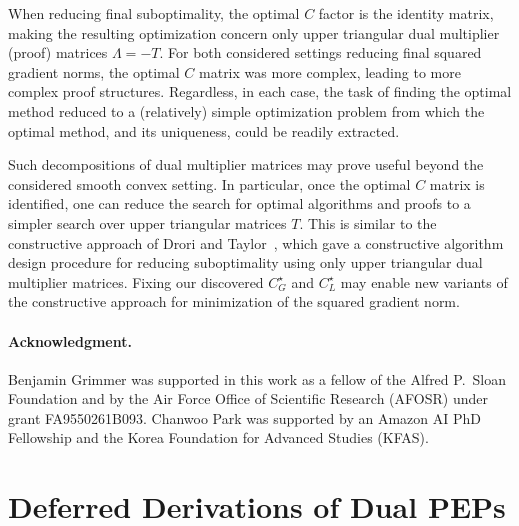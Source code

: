 \documentclass[11pt]{article}
\begin{document}
When reducing final suboptimality, the optimal $C$ factor is the identity matrix, making the resulting optimization concern only upper triangular dual multiplier (proof) matrices $\Lambda = -T$. For both considered settings reducing final squared gradient norms, the optimal $C$ matrix was more complex, leading to more complex proof structures. Regardless, in each case, the task of finding the optimal method reduced to a (relatively) simple optimization problem from which the optimal method, and its uniqueness, could be readily extracted.

Such decompositions of dual multiplier matrices may prove useful beyond the considered smooth convex setting. In particular, once the optimal $C$ matrix is identified, one can reduce the search for optimal algorithms and proofs to a simpler search over upper triangular matrices $T$. This is similar to the constructive approach of Drori and Taylor~\cite{DT20}, which gave a constructive algorithm design procedure for reducing suboptimality using only upper triangular dual multiplier matrices. Fixing our discovered $C_G^\star$ and $C_L^\star$ may enable new variants of the constructive approach for minimization of the squared gradient norm.



{\small \paragraph{Acknowledgment.} Benjamin Grimmer was supported in this work as a fellow of the Alfred P.~Sloan Foundation and by the Air Force Office of Scientific Research (AFOSR) under grant FA9550261B093. Chanwoo Park was supported by an Amazon AI PhD Fellowship and the Korea Foundation for Advanced Studies (KFAS).}

{
\small


}
\clearpage
\appendix
\section{Deferred Derivations of Dual PEPs}
\end{document}
